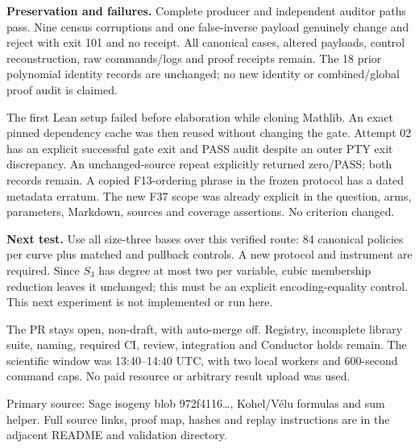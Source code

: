 \documentclass[11pt]{article}
\begin{document}
\textbf{Preservation and failures.} Complete producer and independent auditor
paths pass. Nine census corruptions and one false-inverse payload genuinely
change and reject with exit 101 and no receipt. All canonical cases, altered
payloads, control reconstruction, raw commands/logs and proof receipts remain.
The 18 prior polynomial identity records are unchanged; no new identity or
combined/global proof audit is claimed.

The first Lean setup failed before elaboration while cloning Mathlib. An exact
pinned dependency cache was then reused without changing the gate. Attempt 02
has an explicit successful gate exit and PASS audit despite an outer PTY exit
discrepancy. An unchanged-source repeat explicitly returned zero/PASS; both
records remain. A copied F13-ordering phrase in the frozen protocol has a dated
metadata erratum. The new F37 scope was already explicit in the question, arms,
parameters, Markdown, sources and coverage assertions. No criterion changed.

\textbf{Next test.} Use all size-three bases over this verified route: 84
canonical policies per curve plus matched and pullback controls. A new protocol
and instrument are required. Since $S_3$ has degree at most two per variable,
cubic membership reduction leaves it unchanged; this must be an explicit
encoding-equality control. This next experiment is not implemented or run here.

The PR stays open, non-draft, with auto-merge off. Registry, incomplete library
suite, naming, required CI, review, integration and Conductor holds remain.
The scientific window was 13:40--14:40 UTC, with two local workers and 600-second
command caps. No paid resource or arbitrary result upload was used.

\small Primary source: Sage isogeny blob 972f4116\ldots, Kohel/V\'elu formulas
and sum helper. Full source links, proof map, hashes and replay instructions are
in the adjacent README and validation directory.
\end{document}
